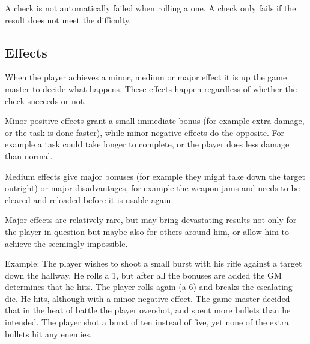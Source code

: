 A check is not automatically failed when rolling a one. A check only fails if
the result does not meet the difficulty.

\subsection{Effects}

When the player achieves a minor, medium or major effect it is up the game
master to decide what happens. These effects happen regardless of whether the
check succeeds or not.

Minor positive effects grant a small immediate bonus (for example extra
damage, or the task is done faster), while minor negative effects do the
opposite. For example a task could take longer to complete, or the player
does less damage than normal.

Medium effects give major bonuses (for example they might take down the target
outright) or major disadvantages, for example the weapon jams and needs to be
cleared and reloaded before it is usable again.

Major effects are relatively rare, but may bring devastating results not only
for the player in question but maybe also for others around him, or allow him
to achieve the seemingly impossible.

Example: The player wishes to shoot a small burst with his rifle against a
target down the hallway. He rolls a 1, but after all the bonuses are added
the GM determines that he hits. The player rolls again (a 6) and breaks the
escalating die. He hits, although with a minor negative effect. The game
master decided that in the heat of battle the player overshot, and spent
more bullets than he intended. The player shot a burst of ten instead of five,
yet none of the extra bullets hit any enemies.
